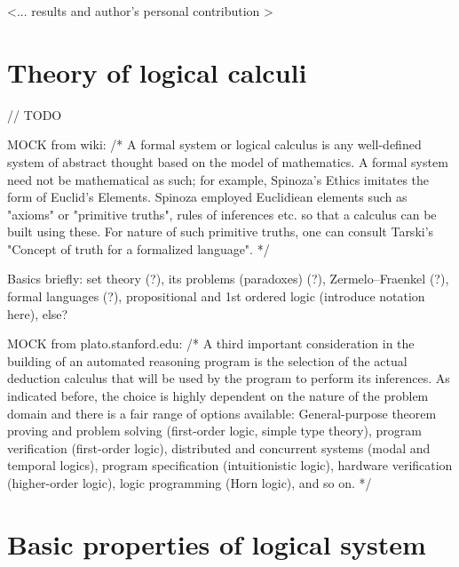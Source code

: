\documentclass[article]{aaltoseries}
\begin{document}
<... results and author's personal contribution >


\section{Theory of logical calculi}
\label{sec:formal_theory}

// TODO

MOCK from wiki: /* A formal system or logical calculus is any well-defined system of abstract thought based on the model of mathematics. A formal system need not be mathematical as such; for example, Spinoza's Ethics imitates the form of Euclid's Elements. Spinoza employed Euclidiean elements such as "axioms" or "primitive truths", rules of inferences etc. so that a calculus can be built using these. For nature of such primitive truths, one can consult Tarski's "Concept of truth for a formalized language".
*/

Basics briefly: set theory (?), its problems (paradoxes) (?), Zermelo–Fraenkel (?), formal languages (?), propositional and 1st ordered logic (introduce notation here), else?


MOCK from plato.stanford.edu:  %
/* A third important consideration in the building of an automated reasoning program is the selection of the actual deduction calculus that will be used by the program to perform its inferences. As indicated before, the choice is highly dependent on the nature of the problem domain and there is a fair range of options available: General-purpose theorem proving and problem solving (first-order logic, simple type theory), program verification (first-order logic), distributed and concurrent systems (modal and temporal logics), program specification (intuitionistic logic), hardware verification (higher-order logic), logic programming (Horn logic), and so on.
*/




\section{Basic properties of logical system}
\label{sec:logic_properties}
\end{document}

